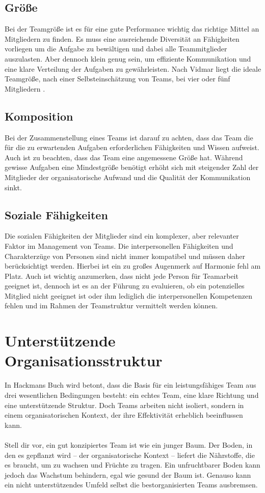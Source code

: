 \subsection{Größe}
Bei der Teamgröße ist es für eine gute Performance wichtig das richtige Mittel an Mitgliedern zu finden. Es muss eine ausreichende Diversität an Fähigkeiten vorliegen um die Aufgabe zu bewältigen und dabei alle Teammitglieder auszulasten. Aber dennoch klein genug sein, um effiziente Kommunikation und eine klare Verteilung der Aufgaben zu gewährleisten. Nach Vidmar liegt die ideale Teamgröße, nach einer Selbsteinschätzung von Teams, bei vier oder fünf Mitgliedern \cite{a985d9bd-bc17-3a58-b90d-1cca2b2b7d68}.
\subsection{Komposition}
Bei der Zusammenstellung eines Teams ist darauf zu achten, dass das Team die für die zu erwartenden Aufgaben erforderlichen Fähigkeiten und Wissen aufweist. Auch ist zu beachten, dass das Team eine angemessene Größe hat. Während gewisse Aufgaben eine Mindestgröße benötigt erhöht sich mit steigender Zahl der Mitglieder der organisatorische Aufwand und die Qualität der Kommunikation sinkt.
\subsection{Soziale Fähigkeiten}
Die sozialen Fähigkeiten der Mitglieder sind ein komplexer, aber relevanter Faktor im Management von Teams. Die interpersonellen Fähigkeiten und Charakterzüge von Personen sind nicht immer kompatibel und müssen daher berücksichtigt werden. Hierbei ist ein zu großes Augenmerk auf Harmonie fehl am Platz. Auch ist wichtig anzumerken, dass nicht jede Person für Teamarbeit geeignet ist, dennoch ist es an der Führung zu evaluieren, ob ein potenzielles Mitglied nicht geeignet ist oder ihm lediglich die interpersonellen Kompetenzen fehlen und im Rahmen der Teamstruktur vermittelt werden können.

\section{Unterstützende Organisationsstruktur}
In Hackmans Buch wird betont, dass die Basis für ein leistungsfähiges Team aus drei wesentlichen Bedingungen besteht: ein echtes Team, eine klare Richtung und eine unterstützende Struktur. Doch Teams arbeiten nicht isoliert, sondern in einem organisatorischen Kontext, der ihre Effektivität erheblich beeinflussen kann.\\\\
Stell dir vor, ein gut konzipiertes Team ist wie ein junger Baum. Der Boden, in den es gepflanzt wird – der organisatorische Kontext – liefert die Nährstoffe, die es braucht, um zu wachsen und Früchte zu tragen. Ein unfruchtbarer Boden kann jedoch das Wachstum behindern, egal wie gesund der Baum ist. Genauso kann ein nicht unterstützendes Umfeld selbst die bestorganisierten Teams ausbremsen.

